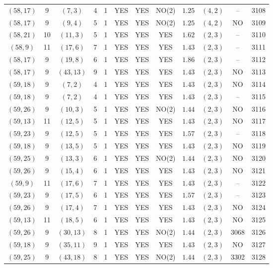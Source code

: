 \begin{longtable}{|c|c|c|c|c|c|c|c|c|c|c|c|}
$(58,17)$ & 9 & $(7,3)$ & 4 & 1 & YES & YES & NO(2) & $1.25$ & $(4,2)$ & -- & 3108\\
$(58,17)$ & 9 & $(9,4)$ & 5 & 1 & YES & YES & NO(2) & $1.25$ & $(4,2)$ & NO & 3109\\
$(58,21)$ & 10 & $(11,3)$ & 5 & 1 & YES & YES & YES & $1.62$ & $(2,3)$ & -- & 3110\\
$(58,9)$ & 11 & $(17,6)$ & 7 & 1 & YES & YES & YES & $1.43$ & $(2,3)$ & -- & 3111\\
$(58,17)$ & 9 & $(19,8)$ & 6 & 1 & YES & YES & YES & $1.86$ & $(2,3)$ & -- & 3112\\
$(58,17)$ & 9 & $(43,13)$ & 9 & 1 & YES & YES & YES & $1.43$ & $(2,3)$ & NO & 3113\\
$(59,18)$ & 9 & $(7,2)$ & 4 & 1 & YES & YES & YES & $1.43$ & $(2,3)$ & NO & 3114\\
$(59,18)$ & 9 & $(7,2)$ & 4 & 1 & YES & YES & YES & $1.43$ & $(2,3)$ & -- & 3115\\
$(59,26)$ & 9 & $(10,3)$ & 5 & 1 & YES & YES & NO(2) & $1.44$ & $(2,3)$ & NO & 3116\\
$(59,13)$ & 11 & $(12,5)$ & 5 & 1 & YES & YES & YES & $1.43$ & $(2,3)$ & NO & 3117\\
$(59,23)$ & 9 & $(12,5)$ & 5 & 1 & YES & YES & YES & $1.57$ & $(2,3)$ & -- & 3118\\
$(59,18)$ & 9 & $(13,5)$ & 5 & 1 & YES & YES & YES & $1.43$ & $(2,3)$ & NO & 3119\\
$(59,25)$ & 9 & $(13,3)$ & 6 & 1 & YES & YES & NO(2) & $1.44$ & $(2,3)$ & NO & 3120\\
$(59,26)$ & 9 & $(15,4)$ & 6 & 1 & YES & YES & YES & $1.43$ & $(2,3)$ & NO & 3121\\
$(59,9)$ & 11 & $(17,6)$ & 7 & 1 & YES & YES & YES & $1.43$ & $(2,3)$ & -- & 3122\\
$(59,23)$ & 9 & $(17,5)$ & 6 & 1 & YES & YES & YES & $1.57$ & $(2,3)$ & -- & 3123\\
$(59,26)$ & 9 & $(17,4)$ & 7 & 1 & YES & YES & YES & $1.43$ & $(2,3)$ & NO & 3124\\
$(59,13)$ & 11 & $(18,5)$ & 6 & 1 & YES & YES & YES & $1.43$ & $(2,3)$ & NO & 3125\\
$(59,26)$ & 9 & $(30,13)$ & 8 & 1 & YES & YES & NO(2) & $1.44$ & $(2,3)$ & 3068 & 3126\\
$(59,18)$ & 9 & $(35,11)$ & 9 & 1 & YES & YES & YES & $1.43$ & $(2,3)$ & NO & 3127\\
$(59,25)$ & 9 & $(43,18)$ & 8 & 1 & YES & YES & NO(2) & $1.44$ & $(2,3)$ & 3302 & 3128\\

\end{longtable}
